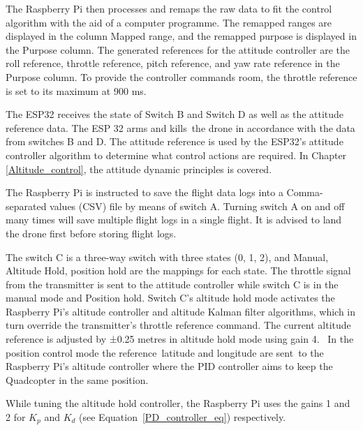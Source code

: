 \documentclass{article}
\begin{document}
The Raspberry Pi then processes and remaps the raw data to fit the control algorithm with the aid of a computer programme. The remapped ranges are displayed in the column Mapped range, and the remapped purpose is displayed in the Purpose column. The generated references for the attitude controller are the roll reference, throttle reference, pitch reference, and yaw rate reference in the Purpose column.
To provide the controller commands room, the throttle reference is set to its maximum at 900 ms.

The ESP32 receives the state of Switch B and Switch D as well as the attitude reference data. The ESP 32  arms and kills the drone in accordance with the data from switches B and D. The attitude reference is used by the ESP32's attitude controller algorithm to determine what control actions are required. In Chapter \ref{Altitude_control}, the attitude dynamic principles is covered. 

The Raspberry Pi is instructed to save the flight data logs into a Comma-separated values (CSV) file by means of switch A. Turning switch A on and off many times will save multiple flight logs in a single flight. It is advised to land the drone first before storing flight logs.

The switch C is a three-way switch with three states ({0, 1, 2}), and {Manual, Altitude Hold, position hold} are the mappings for each state. The throttle signal from the transmitter is sent to the attitude controller while switch C is in the manual mode and Position hold. Switch C's altitude hold mode activates the Raspberry Pi's altitude controller and altitude Kalman filter algorithms, 
which in turn override the transmitter's throttle reference command. The current altitude reference is adjusted by ±0.25 metres in altitude hold mode using gain 4.  In the position control mode the reference latitude and longitude are sent to the Raspberry Pi's altitude controller where the PID controller aims to keep the Quadcopter in the same position.

While tuning the altitude hold controller, the Raspberry Pi uses the gains 1 and 2 for $K_{p}$ and ${K}_{d}$ (see Equation~\ref{PD_controller_eq}) respectively.
\end{document}
